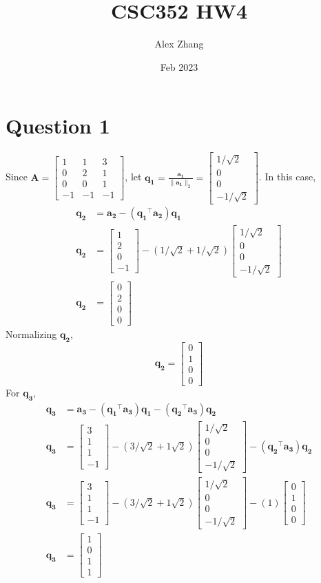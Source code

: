 \documentclass{article}
\title{CSC352 HW4}
\author{Alex Zhang}
\date{Feb 2023}
\newcommand{\bmat}[1]{\begin{bmatrix} #1 \end{bmatrix}}
\newcommand{\mat}[1]{\mathbf{#1}}
\begin{document}
\maketitle

\section*{Question 1}
Since $\mat{A} = \bmat{1 & 1 & 3 \\ 0 & 2 & 1 \\ 0 & 0 & 1 \\ -1 & -1 & -1}$,
let $\mat{q_1} = \frac{\mat{a_1}}{\| \mat{a_1}\|_2}  = \bmat{1/\sqrt{2} \\ 0 \\ 0 \\ -1/ \sqrt{2}}$.
In this case,
\begin{align}
    \mat{q_2} &= \mat{a_2}-(\mat{q_1}^\top\mat{a_2})\mat{q_1} \nonumber \\
    \mat{q_2} &= \bmat{1\\2\\0\\-1}-(1/\sqrt{2} + 1/\sqrt{2}) \bmat{1/\sqrt{2} \\ 0 \\ 0 \\ -1/ \sqrt{2}} \nonumber \\
    \mat{q_2} &= \bmat{0\\2\\0\\0} \nonumber
\end{align}
Normalizing $\mat{q_2}$,
$$\mat{q_2} = \bmat{0\\1\\0\\0}$$
For $\mat{q_3}$,
\begin{align}
    \mat{q_3} &= \mat{a_3} - (\mat{q_1}^\top \mat{a_3})\mat{q_1} - (\mat{q_2}^\top \mat{a_3})\mat{q_2} \nonumber \\
    \mat{q_3} &= \bmat{3\\1\\1\\-1} - (3/\sqrt{2} + 1\sqrt{2})\bmat{1/\sqrt{2}\\0\\0\\-1/\sqrt{2}} - (\mat{q_2}^\top \mat{a_3})\mat{q_2} \nonumber \\
    \mat{q_3} &= \bmat{3\\1\\1\\-1} - (3/\sqrt{2} + 1\sqrt{2})\bmat{1/\sqrt{2}\\0\\0\\-1/\sqrt{2}} - (1)\bmat{0\\1\\0\\0} \nonumber \\
    \mat{q_3} &= \bmat{1\\0\\1\\1} \nonumber
\end{align}
\end{document}
